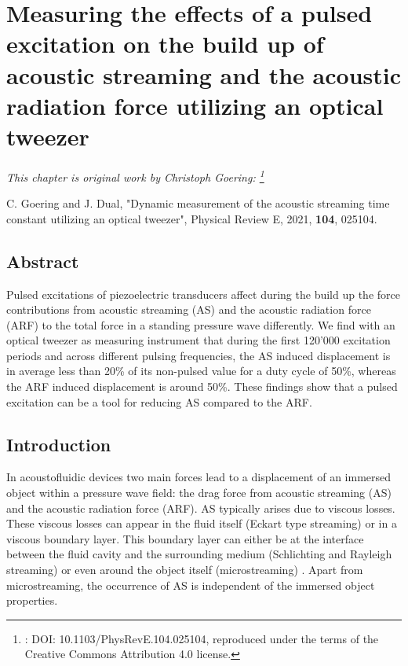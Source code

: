 \renewcommand{\relPath}{SECTION/40_Pulsing/}

\chapter[Pulsed Build up Measurement]{Measuring the effects of a pulsed 
  excitation on the build up of acoustic streaming and the acoustic radiation 
  force utilizing an optical tweezer
}\label{ch:pulsing}
\textit{This chapter is original work by Christoph Goering:
\footnote{: DOI: 10.1103/PhysRevE.104.025104, reproduced under the terms of the 
Creative Commons Attribution 4.0 license.}}

\vspace{5mm} \noindent
C. Goering and J. Dual, "Dynamic measurement of the acoustic streaming time 
constant utilizing an optical tweezer", Physical Review E, 2021, \textbf{104}, 
025104.


\section{Abstract}

Pulsed excitations of piezoelectric transducers affect during the build up the 
force contributions from acoustic streaming (AS) and the acoustic radiation 
force (ARF) to the total force in a standing pressure wave differently. We find 
with an optical tweezer as measuring instrument that during the first 120'000 
excitation periods and across different pulsing frequencies, the AS induced 
displacement is in average less than 20\% of its non-pulsed value for a duty 
cycle of 50\%, whereas the ARF induced displacement is around 50\%. These 
findings show that a pulsed excitation can be a tool for reducing AS compared 
to the ARF.
\section{Introduction}

In acoustofluidic devices two main forces lead to a displacement of an immersed 
object within a pressure wave field: the drag force from acoustic streaming 
(AS) and the acoustic radiation force (ARF). AS typically arises due to viscous 
losses. These viscous losses can appear in the fluid itself (Eckart type 
streaming) \cite{Eckart1948} or in a viscous boundary layer. This boundary 
layer can either be at the interface between the fluid cavity and the 
surrounding medium (Schlichting and Rayleigh streaming) 
\cite{Nyborg1965,Schlichting1932} or even around the object itself 
(microstreaming) \cite{Baasch2019}. Apart from microstreaming, the occurrence 
of AS is independent of the immersed object properties.

